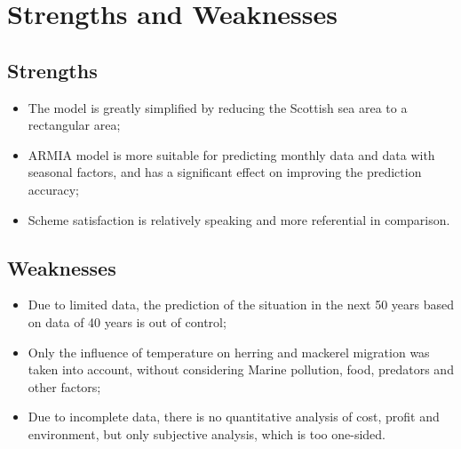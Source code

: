 \documentclass{mcmthesis}
\begin{document}
\section{Strengths and Weaknesses}

\subsection{Strengths}

\begin{itemize}
	
	\item The model is greatly simplified by reducing the Scottish sea area to a rectangular area;
	
	\item ARMIA model is more suitable for predicting monthly data and data with seasonal factors, and has a significant effect on improving the prediction accuracy;
	
	\item Scheme satisfaction is relatively speaking and more referential in comparison.
	
\end{itemize}

\begin{comment}
\begin{itemize}
\item \textbf{Applies widely}\\
This  system can be used for many types of airplanes, and it also
solves the interference during  the procedure of the boarding
airplane,as described above we can get to the  optimization
boarding time.We also know that all the service is automate.
\item \textbf{Improve the quality of the airport service}\\
Balancing the cost of the cost and the benefit, it will bring in
more convenient  for airport and passengers.It also saves many
human resources for the airline. \item \textbf{}
\end{itemize}
\end{comment}

\subsection{Weaknesses}

\begin{itemize}

\item Due to limited data, the prediction of the situation in the next 50 years based on data of 40 years is out of control;

\item Only the influence of temperature on herring and mackerel migration was taken into account, without considering Marine pollution, food, predators and other factors;

\item Due to incomplete data, there is no quantitative analysis of cost, profit and environment, but only subjective analysis, which is too one-sided.

\end{itemize}
\end{document}

